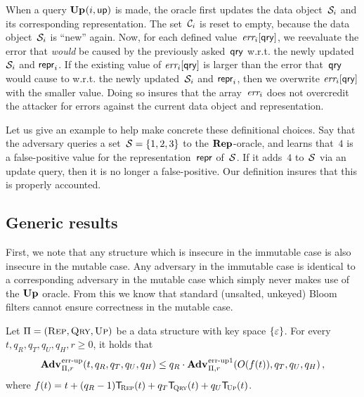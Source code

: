 When a query $\mathbf{Up}\hspace{0.5pt}(i,\mathsf{up})$ is made, the oracle first updates the data object~$\mathcal{S}_i$ and its corresponding representation.  The set~$\mathcal{C}_i$ is reset to empty, because the data object~$\mathcal{S}_i$ is ``new'' again.
%
Now, for each defined value~$\textit{err}_i[\mathsf{qry}]$, we reevaluate the error that \emph{would} be caused by the previously asked~$\mathsf{qry}$ w.r.t. the newly updated $\mathcal{S}_i$ and $\mathsf{repr}_i$.  If the existing value of $\textit{err}_i[\mathsf{qry}]$ is larger than the error that~$\mathsf{qry}$ would cause to w.r.t. the newly updated~$\mathcal{S}_i$ and $\mathsf{repr}_i$, then we overwrite $\textit{err}_i[\mathsf{qry}]$ with the smaller value.  Doing so insures that the array~$\textit{err}_i$ does not overcredit the attacker for errors against the current data object and representation.

Let us give an example to help make concrete these definitional choices.  Say that the adversary queries a set~$\mathcal{S} = \{1,2,3\}$ to the $\mathbf{Rep}\hspace{0.5pt}$-oracle, and learns that~$4$ is a false-positive value for the representation~$\mathsf{repr}$ of~$\mathcal{S}$.  If it adds~$4$ to~$\mathcal{S}$ via an update query, then it is no longer a false-positive.  Our definition insures that this is properly accounted.

\subsection{Generic results}
First, we note that any structure which is insecure in the immutable case is also insecure in the mutable case. Any adversary in the immutable case is identical to a corresponding adversary in the mutable case which simply never makes use of the $\mathbf{Up}\hspace{0.5pt}$ oracle. From this we know that standard (unsalted, unkeyed) Bloom filters cannot ensure correctness in the mutable case. 


 

\begin{lemma}\label{lemma:errep}
   Let $\mathrm{\Pi} = (\textsc{Rep}, \textsc{Qry}, \textsc{Up})$ be a data structure with key
  space $\{\varepsilon\}$. For every $t, q_R, q_T, q_U, q_H, r\geq 0$, it holds that
  \[
    \Adv{\errep}_{\struct,r}(t, q_R, q_T, q_U, q_H) \leq
    q_R\cdot\Adv{\errep1}_{\struct,r}(O(f(t)), q_T, q_U, q_H) \,,
  \]
  where $f(t) = t + (q_R-1)\ticks(\Rep,t) + q_T\ticks(\Qry,t) + q_U\ticks(\Up,t)$.
\end{lemma}

